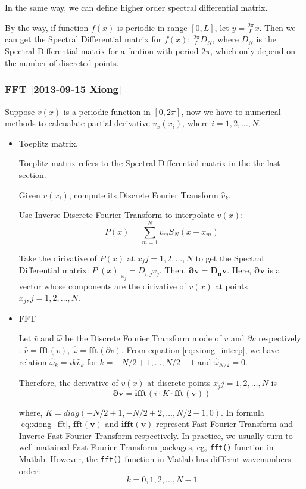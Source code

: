 In the same way, we can define higher order spectral differential matrix.

By the way, if function $f(x)$ is periodic in range $[0,L]$, let $y=\frac{2\pi}{L}x$.
Then we can get the Spectral Differential matrix for $f(x)$: $\frac{2\pi}{L}D_{N}$,
where $D_{N}$ is the Spectral Differential matrix for a funtion with period $2\pi$,
which only depend on the number of discreted points.

\subsubsection{FFT [2013-09-15 Xiong]}
Suppose $v(x)$ is a periodic function in $[0,2\pi]$, now we have to numerical
methods to calcualate partial derivative $v_{x}(x_i)$, where $i=1,2,\dots , N$.

\begin{itemize}
 \item Toeplitz matrix.

 Toeplitz matrix refers to the Spectral Differential matrix in the the last section.

 Given $v(x_i)$, compute its Discrete Fourier Transform $\hat{v}_{k}$.

 Use Inverse Discrete Fourier Transform to interpolate $v(x)$:
 \[
 P(x)=\sum_{m=1}^{N}v_{m}S_{N}(x-x_{m})
\]

 Take the dirivative of $P(x)$ at $x_{j} j=1,2,\dots , N$ to get the Spectral
 Differential matrix: $P^{'}(x)|_{x_{j}}=D_{i,j}v_{j}$. Then,
 $\mathbf{\partial v}=\mathbf{D_{n}}\mathbf{v}$. Here, $\mathbf{\partial v}$ is a vector
 whose components are the dirivative of $v(x)$ at points $x_{j}, j=1,2,\dots , N$.

 \item FFT

 Let $\hat{v}$ and $\hat{\omega}$ be
 the Discrete Fourier Transform mode of $v$ and $\partial v$ respectively
 : $\hat{v}=\mathbf{fft}(v)$, $\hat{\omega}=\mathbf{fft}(\partial v)$.
 From equation \eqref{eq:xiong_interp}, we have
 relation $\hat{\omega}_{k}=ik\hat{v}_{k}$ for $k=-N/2+1,\dots , N/2-1$
 and $\hat{\omega}_{N/2}=0$.

 Therefore, the derivative of $v(x)$ at discrete points $x_{j} j=1,2,\dots , N$ is
 \begin{equation}
 \label{eq:xiong_fft}
  \mathbf{\partial v}=\mathbf{ifft}(i\cdot K\cdot \mathbf{fft(v)})
 \end{equation}

 where, $K=diag(-N/2+1,-N/2+2,\dots, N/2-1, 0)$. In formula \eqref{eq:xiong_fft},
 $\mathbf{fft(v)}$ and $\mathbf{ifft(v)}$ represent Fast Fourier Transform and
 Inverse Fast Fourier Transform respectively. In practice, we usually turn to
 well-matained Fast Fourier Transform packages, eg, \texttt{fft()} function in Matlab.
 However, the \texttt{fft()} function in Matlab has difffernt wavenumbers order:
  \begin{equation}
  \label{eq:xiong_wavenumber_fft}
  k=0,1,2,\dots , N-1
 \end{equation}


\end{itemize}
